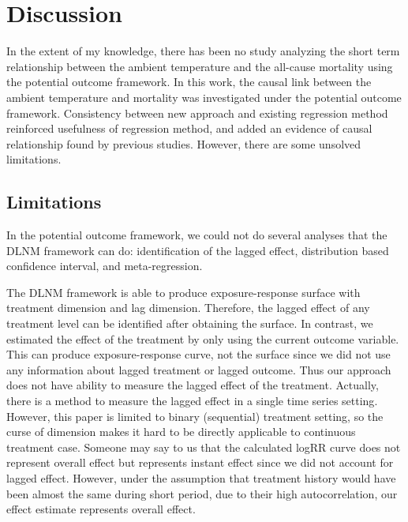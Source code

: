 \documentclass[12pt]{article}
\begin{document}
\section{Discussion}

In the extent of my knowledge, there has been no study analyzing the short term relationship 
between the ambient temperature and the all-cause mortality using the potential outcome framework.
In this work, the causal link between the ambient temperature and mortality 
was investigated under the potential outcome framework.
Consistency between new approach and existing regression method reinforced
usefulness of regression method, and added an evidence of causal relationship found by previous studies.
However, there are some unsolved limitations.

\subsection{Limitations}

In the potential outcome framework, we could not do several analyses that the DLNM framework can do:
identification of the lagged effect, distribution based confidence interval, and meta-regression.

The DLNM framework is able to produce 
exposure-response surface with treatment dimension and lag dimension.
Therefore, the lagged effect of any treatment level can be identified after obtaining the surface.
In contrast, we estimated the effect of the treatment by only using the current outcome variable.
This can produce exposure-response curve, not the surface 
since we did not use any information about lagged treatment or lagged outcome.
Thus our approach does not have ability to measure the lagged effect of the treatment.
Actually, there is a method to measure the lagged effect in a single time series setting\cite{bojinov2019}.
However, this paper is limited to binary (sequential) treatment setting,
so the curse of dimension makes it hard to be directly applicable to continuous treatment case.
Someone may say to us that the calculated logRR curve does not represent overall effect 
but represents instant effect since we did not account for lagged effect.
However, under the assumption that 
treatment history would have been almost the same during short period, due to their high autocorrelation,
our effect estimate represents overall effect.
\end{document}
